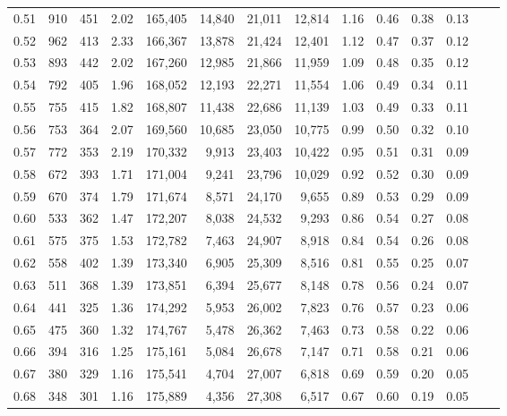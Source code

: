 \begin{tabular}{rrrrrrrrrrrrrr}
0.51 &    910 &  451 &    2.02 &  165,405 &   14,840 &  21,011 &  12,814 &  1.16 &  0.46 &  0.38 &      0.13 \\
0.52 &    962 &  413 &    2.33 &  166,367 &   13,878 &  21,424 &  12,401 &  1.12 &  0.47 &  0.37 &      0.12 \\
0.53 &    893 &  442 &    2.02 &  167,260 &   12,985 &  21,866 &  11,959 &  1.09 &  0.48 &  0.35 &      0.12 \\
0.54 &    792 &  405 &    1.96 &  168,052 &   12,193 &  22,271 &  11,554 &  1.06 &  0.49 &  0.34 &      0.11 \\
0.55 &    755 &  415 &    1.82 &  168,807 &   11,438 &  22,686 &  11,139 &  1.03 &  0.49 &  0.33 &      0.11 \\
0.56 &    753 &  364 &    2.07 &  169,560 &   10,685 &  23,050 &  10,775 &  0.99 &  0.50 &  0.32 &      0.10 \\
0.57 &    772 &  353 &    2.19 &  170,332 &    9,913 &  23,403 &  10,422 &  0.95 &  0.51 &  0.31 &      0.09 \\
0.58 &    672 &  393 &    1.71 &  171,004 &    9,241 &  23,796 &  10,029 &  0.92 &  0.52 &  0.30 &      0.09 \\
0.59 &    670 &  374 &    1.79 &  171,674 &    8,571 &  24,170 &   9,655 &  0.89 &  0.53 &  0.29 &      0.09 \\
0.60 &    533 &  362 &    1.47 &  172,207 &    8,038 &  24,532 &   9,293 &  0.86 &  0.54 &  0.27 &      0.08 \\
0.61 &    575 &  375 &    1.53 &  172,782 &    7,463 &  24,907 &   8,918 &  0.84 &  0.54 &  0.26 &      0.08 \\
0.62 &    558 &  402 &    1.39 &  173,340 &    6,905 &  25,309 &   8,516 &  0.81 &  0.55 &  0.25 &      0.07 \\
0.63 &    511 &  368 &    1.39 &  173,851 &    6,394 &  25,677 &   8,148 &  0.78 &  0.56 &  0.24 &      0.07 \\
0.64 &    441 &  325 &    1.36 &  174,292 &    5,953 &  26,002 &   7,823 &  0.76 &  0.57 &  0.23 &      0.06 \\
0.65 &    475 &  360 &    1.32 &  174,767 &    5,478 &  26,362 &   7,463 &  0.73 &  0.58 &  0.22 &      0.06 \\
0.66 &    394 &  316 &    1.25 &  175,161 &    5,084 &  26,678 &   7,147 &  0.71 &  0.58 &  0.21 &      0.06 \\
0.67 &    380 &  329 &    1.16 &  175,541 &    4,704 &  27,007 &   6,818 &  0.69 &  0.59 &  0.20 &      0.05 \\
0.68 &    348 &  301 &    1.16 &  175,889 &    4,356 &  27,308 &   6,517 &  0.67 &  0.60 &  0.19 &      0.05 \\

\end{tabular}
